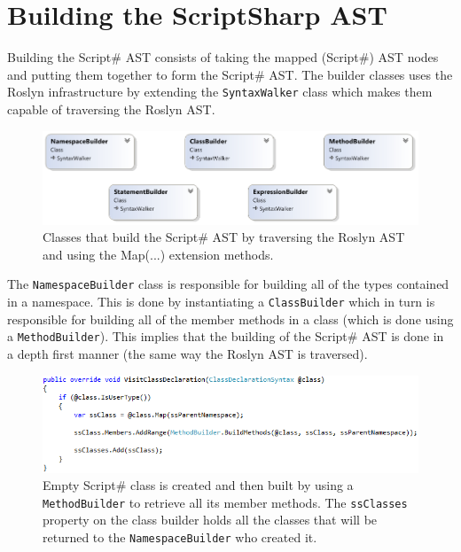 \section{Building the ScriptSharp AST} %
\label{sec:building_the_scriptsharp_ast}
	Building the Script\# AST consists of taking the mapped (Script\#) AST nodes and putting them together to form the Script\# AST. The builder classes uses the Roslyn infrastructure by extending the \texttt{SyntaxWalker} class which makes them capable of traversing the Roslyn AST.
	\begin{figure}[H]
		\begin{center}
			\centerline{\includegraphics[width=16cm]{resources/images/BuilderClasses.png}}
		\end{center}
		\caption{Classes that build the Script\# AST by traversing the Roslyn AST and using the Map(...) extension methods.}
		\label{builderClasses}
	\end{figure}

	The \texttt{NamespaceBuilder} class is responsible for building all of the types contained in a namespace. This is done by instantiating a \texttt{ClassBuilder} which in turn is responsible for building all of the member methods in a class (which is done using a \texttt{MethodBuilder}). This implies that the building of the Script\# AST is done in a depth first manner (the same way the Roslyn AST is traversed).  

	\begin{figure}[H]
		\begin{center}
			\centerline{\includegraphics[width=16cm]{resources/images/VisitClassDeclaration.png}}
		\end{center}
		\caption{Empty Script\# class is created and then built by using a \texttt{MethodBuilder} to retrieve all its member methods. The \texttt{ssClasses} property on the class builder holds all the classes that will be returned to the \texttt{NamespaceBuilder} who created it.}
		\label{visitClassDeclaration}
	\end{figure}

